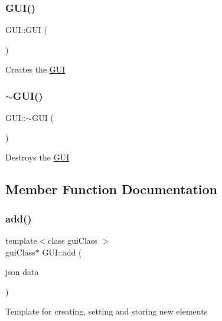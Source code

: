 \subsubsection{\texorpdfstring{G\+U\+I()}{GUI()}}
{\footnotesize\ttfamily G\+U\+I\+::\+G\+UI (\begin{DoxyParamCaption}{ }\end{DoxyParamCaption})\hspace{0.3cm}{\ttfamily [protected]}}

Creates the \hyperlink{class_g_u_i}{G\+UI} \mbox{\label{class_g_u_i_ac9cae2328dcb5d83bdfaeca49a2eb695}} 
\subsubsection{\texorpdfstring{$\sim$\+G\+U\+I()}{~GUI()}}
{\footnotesize\ttfamily G\+U\+I\+::$\sim$\+G\+UI (\begin{DoxyParamCaption}{ }\end{DoxyParamCaption})\hspace{0.3cm}{\ttfamily [protected]}}

Destroys the \hyperlink{class_g_u_i}{G\+UI} 

\subsection{Member Function Documentation}
\mbox{\label{class_g_u_i_a9876e8096b1eb321dd8ef4bc54a457fb}} 
\subsubsection{\texorpdfstring{add()}{add()}}
{\footnotesize\ttfamily template$<$class gui\+Class $>$ \\
gui\+Class$\ast$ G\+U\+I\+::add (\begin{DoxyParamCaption}\item[{json}]{data }\end{DoxyParamCaption})\hspace{0.3cm}{\ttfamily [inline]}}

Template for creating, setting and storing new elements \mbox{\label{class_g_u_i_a9dace388dbf579b96d875f4a051d1174}} 
